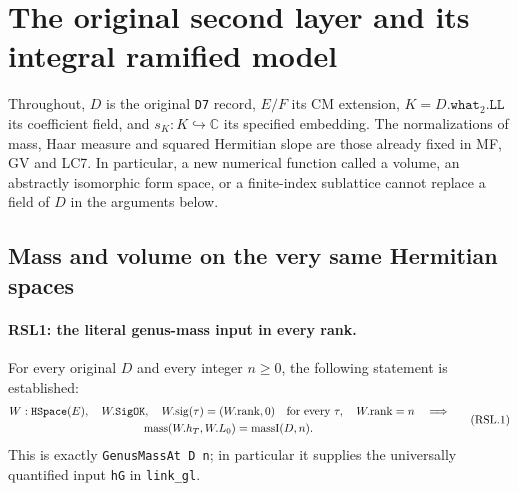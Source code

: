 \section{The original second layer and its integral ramified model}
\label{sec:second-layer-global}


Throughout, $D$ is the original \texttt{D7} record, $E/F$ its CM
extension, $K=D.\texttt{what}_2.\texttt{LL}$ its coefficient field, and
$s_K:K\hookrightarrow\mathbb C$ its specified embedding.  The
normalizations of mass, Haar measure and squared Hermitian slope are
those already fixed in MF, GV and LC7.  In particular, a new numerical
function called a volume, an abstractly isomorphic form space, or a
finite-index sublattice cannot replace a field of $D$ in the arguments
below.

\subsection{Mass and volume on the very same Hermitian spaces}

\paragraph{RSL1: the literal genus-mass input in every rank.}
\label{claim:RSL1}
For every original $D$ and every integer $n\ge0$, the following
statement is established:
\[
 \begin{gathered}
 W:\texttt{HSpace}(E),\quad W.\texttt{SigOK},\quad
 W.\mathrm{sig}(\tau)=(W.\mathrm{rank},0)\quad\hbox{for every }\tau,
 \quad W.\mathrm{rank}=n\quad\Longrightarrow\\
 \operatorname{mass}(W.h_T,W.L_0)=\operatorname{massI}(D,n).
 \end{gathered}                                                   \tag{RSL.1}
\]
This is exactly \texttt{GenusMassAt D n}; in particular it supplies
the universally quantified input \texttt{hG} in \texttt{link\_gl}.

